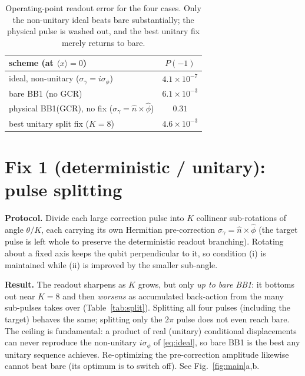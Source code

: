 \documentclass[11pt]{article}
\begin{document}
\begin{table}[h]
\centering
\begin{tabular}{lc}
\toprule
scheme (at $\langle x\rangle=0$) & $P(-1)$ \\
\midrule
ideal, non-unitary ($\sigma_\gamma=i\sigma_\phi$) & $4.1\times10^{-7}$ \\
bare BB1 (no GCR) & $6.1\times10^{-3}$ \\
physical BB1(GCR), no fix ($\sigma_\gamma=\hat n\times\hat\phi$) & $0.31$ \\
best unitary split fix ($K{=}8$) & $4.6\times10^{-3}$ \\
\bottomrule
\end{tabular}
\caption{Operating-point readout error for the four cases. Only the non-unitary ideal beats bare
substantially; the physical pulse is washed out, and the best unitary fix merely returns to bare.}
\label{tab:cases}
\end{table}

\section{Fix 1 (deterministic / unitary): pulse splitting}
\textbf{Protocol.} Divide each large correction pulse into $K$ collinear sub-rotations of angle
$\theta/K$, each carrying its own Hermitian pre-correction $\sigma_\gamma=\hat n\times\hat\phi$
(the target pulse is left whole to preserve the deterministic readout branching). Rotating about a
fixed axis keeps the qubit perpendicular to it, so condition (i) is maintained while (ii) is
improved by the smaller sub-angle.

\textbf{Result.} The readout sharpens as $K$ grows, but only \emph{up to bare BB1}: it bottoms out
near $K{=}8$ and then \emph{worsens} as accumulated back-action from the many sub-pulses takes over
(Table~\ref{tab:split}). Splitting all four pulses (including the target) behaves the same;
splitting only the $2\pi$ pulse does not even reach bare. The ceiling is fundamental: a product of
real (unitary) conditional displacements can never reproduce the non-unitary $i\sigma_\phi$ of
\eqref{eq:ideal}, so bare BB1 is the best any unitary sequence achieves. Re-optimizing the
pre-correction amplitude likewise cannot beat bare (its optimum is to switch off). See
Fig.~\ref{fig:main}a,b.
\end{document}
